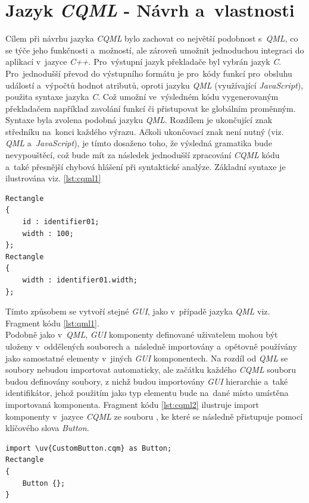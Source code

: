 \documentclass[11pt,twoside,a4paper]{book}
\begin{document}
\section{\label{SEC:CQML}Jazyk \textit{CQML} - Návrh a~vlastnosti}
Cílem při návrhu jazyka \textit{CQML} bylo zachovat co největší podobnost s~\textit{QML}, co se týče jeho funkčnosti a~možností, ale zároveň umožnit jednoduchou integraci do aplikací v~jazyce \textit{C++}. Pro~výstupní jazyk překladače byl vybrán jazyk \textit{C}. Pro~jednodušší převod do výstupního formátu je pro~kódy funkcí pro~obsluhu událostí a~výpočtů hodnot atributů, oproti jazyku \textit{QML} (využívající \textit{JavaScript}), použita syntaxe jazyka \textit{C}. Což umožní ve~výsledném kódu vygenerovaným překladačem například zavolání funkcí či přistupovat ke globálním proměnným.\\
Syntaxe byla zvolena podobná jazyku \textit{QML}. Rozdílem je ukončující znak středníku na~konci každého výrazu. Ačkoli ukončovací znak není nutný (viz. \textit{QML} a~\textit{JavaScript}), je tímto dosaženo toho, že výsledná gramatika bude nevypouštěcí, což bude mít za následek jednodušší zpracování \textit{CQML} kódu a~také přesnější chybová hlášení při syntaktické analýze. Základní syntaxe je ilustrována viz. \ref{lst:cqml1}
\begin{lstlisting}[frame=single,caption=Tvorba dvou jednoduchých elementů pomocí jazyka \textit{CQML}.,label=lst:cqml1]
Rectangle
{
	id : identifier01;
	width : 100;
};
Rectangle
{
	width : identifier01.width;
};
\end{lstlisting}
Tímto způsobem se vytvoří stejné \textit{GUI}, jako v~případě jazyka \textit{QML} viz. Fragment kódu \ref{lst:qml1}.\\
Podobně jako v~\textit{QML}, \textit{GUI} komponenty definované uživatelem mohou být uloženy v~oddělených souborech a~následně importovány a~opětovně používány jako samostatné elementy v~jiných \textit{GUI} komponentech. Na rozdíl od \textit{QML} se soubory nebudou importovat automaticky, ale začátku každého \textit{CQML} souboru budou definovány soubory, z nichž budou importovány \textit{GUI} hierarchie a~také identifikátor, jehož použitím jako typ elementu bude na~dané místo umístěna importovaná komponenta. Fragment kódu \ref{lst:cqml2} ilustruje import komponenty v~jazyce \textit{CQML} ze souboru , ke které se následně přistupuje pomocí klíčového slova \textit{Button}.
\begin{lstlisting}[frame=single,caption=Ukázka importu komponenty v~jazyce \textit{CQML}.,label=lst:cqml2]
import \uv{CustomButton.cqm} as Button;
Rectangle
{
	Button {};
}
\end{lstlisting}
\end{document}
